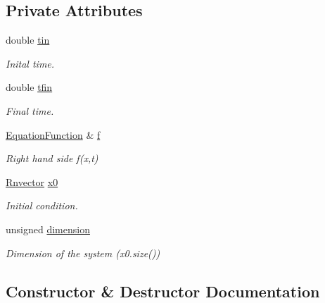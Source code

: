 \subsection*{Private Attributes}
\begin{DoxyCompactItemize}
\item 
double \hyperlink{classBaseEquation_a9003149a3218fd7994c18914cd4446b8}{tin}
\begin{DoxyCompactList}\small\item\em Inital time. \end{DoxyCompactList}\item 
double \hyperlink{classBaseEquation_a5286836cab7d0366681863c8cda0d45b}{tfin}
\begin{DoxyCompactList}\small\item\em Final time. \end{DoxyCompactList}\item 
\hyperlink{structEquationFunction}{Equation\+Function} \& \hyperlink{classBaseEquation_ae7bf8243e94cd4cd762345048849a967}{f}
\begin{DoxyCompactList}\small\item\em Right hand side f(x,t) \end{DoxyCompactList}\item 
\hyperlink{utils_8hpp_a8e0cccfe9e5cee5140bfcfbd9a3a6a0e}{Rnvector} \hyperlink{classBaseEquation_a86cd7c1803bac9d80e15b4dc81571fa7}{x0}
\begin{DoxyCompactList}\small\item\em Initial condition. \end{DoxyCompactList}\item 
unsigned \hyperlink{classBaseEquation_ad57b2ae84acedfb6d38b70e08dc39db3}{dimension}
\begin{DoxyCompactList}\small\item\em Dimension of the system (x0.\+size()) \end{DoxyCompactList}\end{DoxyCompactItemize}


\subsection{Constructor \& Destructor Documentation}
\mbox{\label{classBaseEquation_a649e9bef29ad2885442750f72fde0d69}} 

